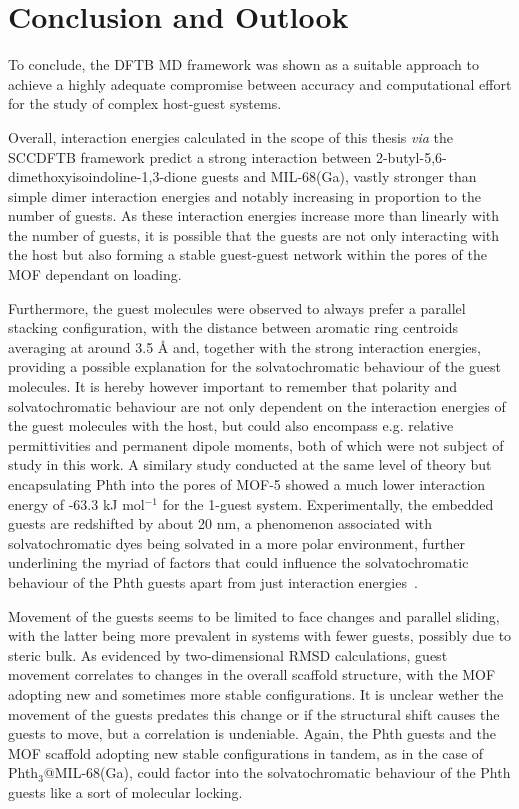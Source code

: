 \documentclass[11pt]{article}
\begin{document}
\section{Conclusion and Outlook}
To conclude, the DFTB MD framework was shown as a suitable approach to achieve a highly adequate compromise between accuracy and computational effort for the study of complex host-guest systems.
\\ \par \noindent
Overall, interaction energies calculated in the scope of this thesis \textit{via} the SCCDFTB framework predict a strong interaction between 2-butyl-5,6-dimethoxyisoindoline-1,3-dione guests and MIL-68(Ga), vastly stronger than simple dimer interaction energies and notably increasing in proportion to the number of guests. As these interaction energies increase more than linearly with the number of guests, it is possible that the guests are not only interacting with the host but also forming a stable guest-guest network within the pores of the MOF dependant on loading.
\\ \par \noindent
Furthermore, the guest molecules were observed to always prefer a parallel stacking configuration, with the distance between aromatic ring centroids averaging at around 3.5 Å and, together with the strong interaction energies, providing a possible explanation for the solvatochromatic behaviour of the guest molecules. It is hereby however important to remember that polarity and solvatochromatic behaviour are not only dependent on the interaction energies of the guest molecules with the host, but could also encompass e.g. relative permittivities and permanent dipole moments, both of which were not subject of study in this work. A similary study conducted at the same level of theory but encapsulating Phth into the pores of MOF-5 showed a much lower interaction energy of -63.3 kJ mol$^{-1}$ for the 1-guest system. Experimentally, the embedded guests are redshifted by about 20 nm, a phenomenon associated with solvatochromatic dyes being solvated in a more polar environment, further underlining the myriad of factors that could influence the solvatochromatic behaviour of the Phth guests apart from just interaction energies~\cite{Schwartz2024}.
\\ \par \noindent
Movement of the guests seems to be limited to face changes and parallel sliding, with the latter being more prevalent in systems with fewer guests, possibly due to steric bulk. As evidenced by two-dimensional RMSD calculations, guest movement correlates to changes in the overall scaffold structure, with the MOF adopting new and sometimes more stable configurations. It is unclear wether the movement of the guests predates this change or if the structural shift causes the guests to move, but a correlation is undeniable. Again, the Phth guests and the MOF scaffold adopting new stable configurations in tandem, as in the case of Phth$_3$@MIL-68(Ga), could factor into the solvatochromatic behaviour of the Phth guests like a sort of molecular locking.
\end{document}
